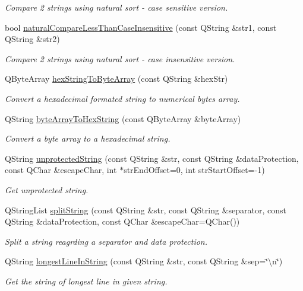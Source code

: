 \begin{DoxyCompactItemize}
\begin{DoxyCompactList}\small\item\em Compare 2 strings using natural sort -\/ case sensitive version. \end{DoxyCompactList}\item 
bool \hyperlink{namespacemdt_algorithms_a3cdc3655f7adfbc5ce03fd39e8d1e986}{natural\-Compare\-Less\-Than\-Case\-Insensitive} (const Q\-String \&str1, const Q\-String \&str2)
\begin{DoxyCompactList}\small\item\em Compare 2 strings using natural sort -\/ case insensitive version. \end{DoxyCompactList}\item 
Q\-Byte\-Array \hyperlink{namespacemdt_algorithms_a5094251abb1557b9b4717b3a0f1a8535}{hex\-String\-To\-Byte\-Array} (const Q\-String \&hex\-Str)
\begin{DoxyCompactList}\small\item\em Convert a hexadecimal formated string to numerical bytes array. \end{DoxyCompactList}\item 
Q\-String \hyperlink{namespacemdt_algorithms_a29977b36180db7518a7ee2317265d26b}{byte\-Array\-To\-Hex\-String} (const Q\-Byte\-Array \&byte\-Array)
\begin{DoxyCompactList}\small\item\em Convert a byte array to a hexadecimal string. \end{DoxyCompactList}\item 
Q\-String \hyperlink{namespacemdt_algorithms_a4f1b12dbe1f3c93dc5138f144d84de93}{unprotected\-String} (const Q\-String \&str, const Q\-String \&data\-Protection, const Q\-Char \&escape\-Char, int $\ast$str\-End\-Offset=0, int str\-Start\-Offset=-\/1)
\begin{DoxyCompactList}\small\item\em Get unprotected string. \end{DoxyCompactList}\item 
Q\-String\-List \hyperlink{namespacemdt_algorithms_a28d7d5eb9578936c950039fa2f86a1bf}{split\-String} (const Q\-String \&str, const Q\-String \&separator, const Q\-String \&data\-Protection, const Q\-Char \&escape\-Char=Q\-Char())
\begin{DoxyCompactList}\small\item\em Split a string reagrding a separator and data protection. \end{DoxyCompactList}\item 
Q\-String \hyperlink{namespacemdt_algorithms_a677bc997e04f77c1be0f5ce0fdb56e67}{longest\-Line\-In\-String} (const Q\-String \&str, const Q\-String \&sep=\char`\"{}\textbackslash{}n\char`\"{})
\begin{DoxyCompactList}\small\item\em Get the string of longest line in given string. \end{DoxyCompactList}\end{DoxyCompactItemize}


